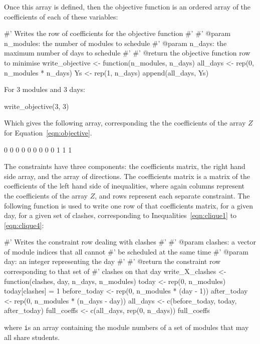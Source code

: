 Once this array is defined, then the objective function is an ordered array of
the coefficients of each of these variables:

\begin{Rin}
#' Writes the row of coefficients for the objective function
#'
#' @param n_modules: the number of modules to schedule
#' @param n_days: the maximum number of days to schedule
#'
#' @return the objective function row to minimise
write_objective <- function(n_modules, n_days){
  all_days <- rep(0, n_modules * n_days)
  Ys <- rep(1, n_days)
  append(all_days, Ys)
}
\end{Rin}

For 3 modules and 3 days:

\begin{Rin}
write_objective(3, 3)
\end{Rin}

Which gives the following array, corresponding the the coefficients of the
array $Z$ for Equation~\ref{eqn:objective}.

\begin{Rout}
[1] 0 0 0 0 0 0 0 0 0 1 1 1
\end{Rout}

The constraints have three components: the coefficients matrix, the right hand
side array, and the array of directions.
The coefficients matrix is a matrix of the coefficients of the left hand side of
inequalities, where again columns represent the coefficients of the array $Z$,
and rows represent each separate constraint.
The following function is used to write one row of that coefficients matrix, for
a given day, for a given set of clashes, corresponding to
Inequalities~\ref{eqn:clique1} to \ref{eqn:clique4}:

\begin{Rin}
#' Writes the constraint row dealing with clashes
#'
#' @param clashes: a vector of module indices that all cannot
#'                 be scheduled at the same time
#' @param day: an integer representing the day
#'
#' @return the constraint row corresponding to that set of
#'         clashes on that day
write_X_clashes <- function(clashes, day, n_days, n_modules){
  today <- rep(0, n_modules)
  today[clashes] = 1
  before_today <- rep(0, n_modules * (day - 1))
  after_today <- rep(0, n_modules * (n_days - day))
  all_days <- c(before_today, today, after_today)
  full_coeffs <- c(all_days, rep(0, n_days))
  full_coeffs
}
\end{Rin}

where \texttt is an array containing the module numbers of a set of
modules that may all share students.

